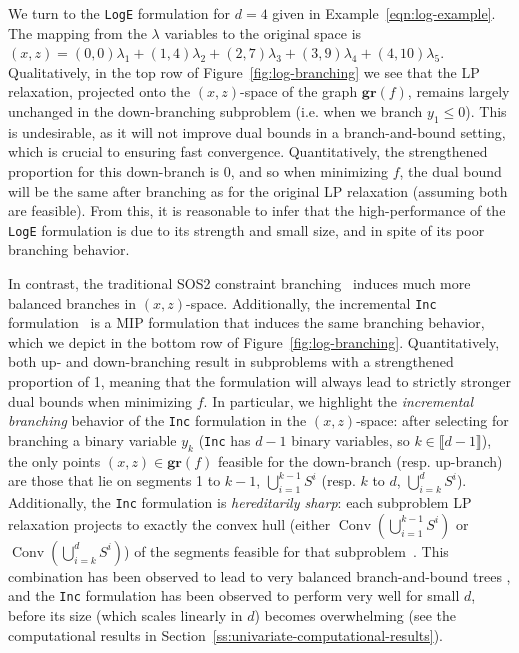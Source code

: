 \documentclass[opre,nonblindrev]{informs3} %
\newcommand{\Conv}{\operatorname{Conv}}
\newcommand{\gr}{\textbf{gr}}
\newcommand{\Log}{\texttt{LogE}}
\newcommand{\Inc}{\texttt{Inc}}
\begin{document}
We turn to the \Log{} formulation for $d=4$ given in Example~\ref{eqn:log-example}. The mapping from the $\lambda$ variables to the original space is $(x,z) = (0,0)\lambda_1 + (1,4)\lambda_2 + (2,7) \lambda_3 + (3,9) \lambda_4 + (4,10) \lambda_5$. Qualitatively, in the top row of Figure~\ref{fig:log-branching} we see that the LP relaxation, projected onto the $(x,z)$-space of the graph $\gr(f)$, remains largely unchanged in the down-branching subproblem (i.e. when we branch $y_1 \leq 0$). This is undesirable, as it will not improve dual bounds in a branch-and-bound setting, which is crucial to ensuring fast convergence. Quantitatively, the strengthened proportion for this down-branch is 0, and so when minimizing $f$, the dual bound will be the same after branching as for the original LP relaxation (assuming both are feasible). From this, it is reasonable to infer that the high-performance of the \Log{} formulation is due to its strength and small size, and in spite of its poor branching behavior.

In contrast, the traditional SOS2 constraint branching~\citep{Beale:1970} induces much more balanced branches in $(x,z)$-space. Additionally, the incremental \Inc{} formulation~\citep{Dantzig:1960,Padberg:2000,Croxton:2003} is a MIP formulation that induces the same branching behavior, which we depict in the bottom row of Figure~\ref{fig:log-branching}. Quantitatively, both up- and down-branching result in subproblems with a strengthened proportion of 1, meaning that the formulation will always lead to strictly stronger dual bounds when minimizing $f$. In particular, we highlight the \emph{incremental branching} behavior of the \Inc{} formulation in the $(x,z)$-space: after selecting for branching a binary variable $y_k$ (\Inc{} has $d-1$ binary variables, so $k \in \llbracket d-1 \rrbracket$), the only points $(x,z) \in \gr(f)$ feasible for the down-branch (resp. up-branch) are those that lie on segments 1 to $k-1$, $\bigcup_{i=1}^{k-1} S^i$ (resp. $k$ to $d$, $\bigcup_{i=k}^d S^i$). Additionally, the \Inc{} formulation is \emph{hereditarily sharp}: each subproblem LP relaxation projects to exactly the convex hull (either $\Conv(\bigcup_{i=1}^{k-1} S^i)$ or $\Conv(\bigcup_{i=k}^d S^i)$) of the segments feasible for that subproblem~\citep{Jeroslow:1984,Jeroslow:1988c}. This combination has been observed to lead to very balanced branch-and-bound trees \citep{Yildiz:2013,Vielma:2015}, and the \Inc{} formulation has been observed to perform very well for small $d$, before its size (which scales linearly in $d$) becomes overwhelming (see the computational results in Section~\ref{ss:univariate-computational-results}).
\end{document}
